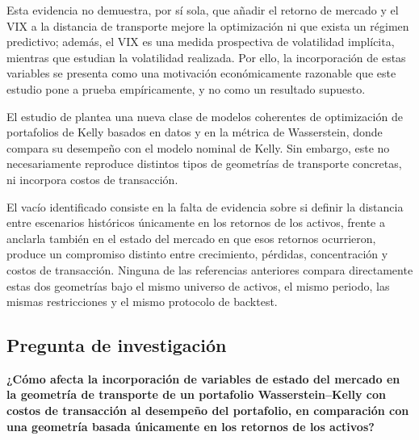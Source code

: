 \documentclass[11pt]{article}
\begin{document}
Esta evidencia no demuestra, por sí sola, que añadir el retorno de mercado y el VIX a la distancia de transporte mejore la optimización ni que exista un régimen predictivo; además, el VIX es una medida prospectiva de volatilidad implícita, mientras que \citet{french1987} estudian la volatilidad realizada. Por ello, la incorporación de estas variables se presenta como una motivación económicamente razonable que este estudio pone a prueba empíricamente, y no como un resultado supuesto.
 

El estudio de \citet{sunzou2025} plantea
 una nueva clase de modelos coherentes de optimización de portafolios de Kelly basados en datos y en la métrica de Wasserstein, donde compara su desempeño con el modelo nominal de Kelly. Sin embargo, este no necesariamente reproduce distintos tipos de geometrías de transporte concretas, ni incorpora costos de transacción.  

El vacío identificado consiste en
 la falta de evidencia sobre si definir la distancia entre escenarios históricos
únicamente en los retornos de los activos, frente a anclarla también en el estado del mercado en que esos retornos ocurrieron, produce un compromiso distinto entre crecimiento, pérdidas, concentración y costos de transacción. Ninguna de las referencias anteriores compara directamente estas dos
geometrías bajo el mismo universo de activos, el mismo periodo, las mismas restricciones y
el mismo protocolo de backtest.

\subsection{Pregunta de investigación}

\begin{displayquote}
\textbf{¿Cómo afecta la incorporación de variables de estado del mercado en la geometría de transporte de un portafolio Wasserstein–Kelly con costos de transacción al desempeño del portafolio, en comparación con una geometría basada únicamente en los retornos de los activos?}
\end{displayquote}
\end{document}
